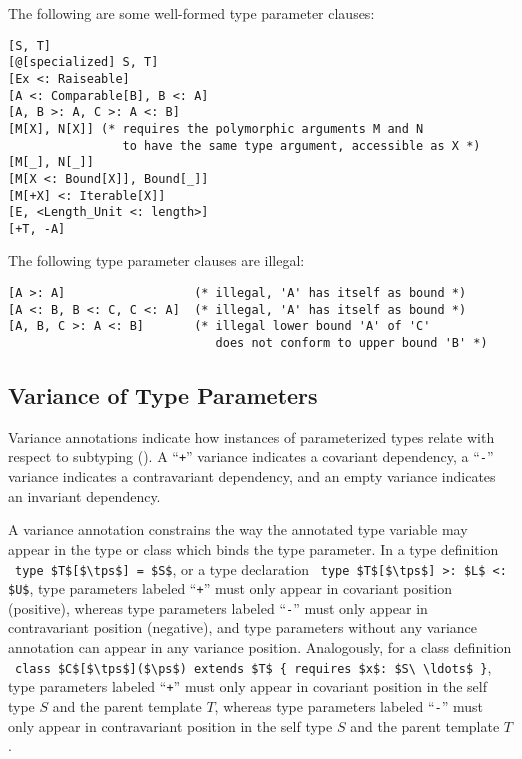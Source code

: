 \example The following are some well-formed type parameter clauses:
\begin{lstlisting}
[S, T]
[@[specialized] S, T]
[Ex <: Raiseable]
[A <: Comparable[B], B <: A]
[A, B >: A, C >: A <: B]
[M[X], N[X]] (* requires the polymorphic arguments M and N 
                to have the same type argument, accessible as X *)
[M[_], N[_]]
[M[X <: Bound[X]], Bound[_]]
[M[+X] <: Iterable[X]]
[E, <Length_Unit <: length>]
[+T, -A]
\end{lstlisting}
The following type parameter clauses are illegal:
\begin{lstlisting}
[A >: A]                  (* illegal, 'A' has itself as bound *)
[A <: B, B <: C, C <: A]  (* illegal, 'A' has itself as bound *)
[A, B, C >: A <: B]       (* illegal lower bound 'A' of 'C'
                             does not conform to upper bound 'B' *)
\end{lstlisting}





\subsection{Variance of Type Parameters}
\label{sec:variance-of-type-parameters}


Variance annotations indicate how instances of parameterized types relate with respect to subtyping (). A ``\lstinline!+!'' variance indicates a covariant dependency, a ``\lstinline!-!'' variance indicates a contravariant dependency, and an empty variance indicates an invariant dependency. 

A variance annotation constrains the way the annotated type variable may appear in the type or class which binds the type parameter. In a type definition ~\lstinline!type $T$[$\tps$] = $S$!, or a type declaration ~\lstinline!type $T$[$\tps$] >: $L$ <: $U$!, type parameters labeled ``\lstinline!+!'' must only appear in covariant position (positive), whereas type parameters labeled ``\lstinline!-!'' must only appear in contravariant position (negative), and type parameters without any variance annotation can appear in any variance position. Analogously, for a class definition ~\lstinline!class $C$[$\tps$]($\ps$) extends $T$ { requires $x$: $S\ \ldots$ }!, type parameters labeled ``\lstinline!+!'' must only appear in covariant position in the self type $S$ and the parent template $T$, whereas type parameters labeled ``\lstinline!-!'' must only appear in contravariant position in the self type $S$ and the parent template $T$.

